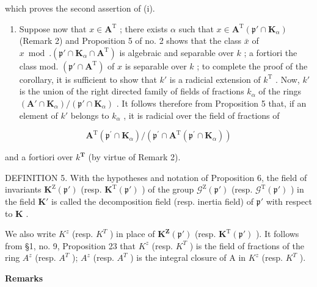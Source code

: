 which proves the second assertion of (i).

\begin{enumerate}
\def\labelenumi{(\roman{enumi})}
\setcounter{enumi}{1}
\tightlist
\item
  Suppose now that \(x \in \mathbf{A}^{\mathrm{T}}\) ; there exists \(\alpha\) such that \(x \in \mathbf{A}^{\mathrm{T}}(\mathfrak{p}' \cap \mathbf{K}_{\alpha})\) (Remark 2) and Proposition 5 of no. 2 shows that the class \(\bar{x}\) of \(x \bmod. (\mathfrak{p}' \cap \mathbf{K}_{\alpha} \cap \mathbf{A}^{\mathrm{T}})\) is algebraic and separable over \(k\) ; a fortiori the class mod. \((\mathfrak{p}' \cap \mathbf{A}^{\mathrm{T}})\) of \(x\) is separable over \(k\) ; to complete the proof of the corollary, it is sufficient to show that \(k'\) is a radicial extension of \(k^{\mathrm{T}}\) . Now, \(k'\) is the union of the right directed family of fields of fractions \(k_{\alpha}\) of the rings \((\mathbf{A}' \cap \mathbf{K}_{\alpha}) / (\mathfrak{p}' \cap \mathbf{K}_{\alpha})\) . It follows therefore from Proposition 5 that, if an element of \(k'\) belongs to \(k_{\alpha}\) , it is radicial over the field of fractions of
\end{enumerate}

\[
\mathbf {A} ^ {\mathrm{T}} \left(\mathfrak {p} ^ {\prime} \cap \mathbf {K} _ {\alpha}\right) / \left(\mathfrak {p} ^ {\prime} \cap \mathbf {A} ^ {\mathrm{T}} \left(\mathfrak {p} ^ {\prime} \cap \mathbf {K} _ {\alpha}\right)\right)
\]

and a fortiori over \(k^{\mathbf{T}}\) (by virtue of Remark 2).

DEFINITION 5. With the hypotheses and notation of Proposition 6, the field of invariants \(\mathbf{K}^{\mathrm{Z}}(\mathfrak{p}')\) (resp. \(\mathbf{K}^{\mathrm{T}}(\mathfrak{p}')\) ) of the group \(\mathcal{G}^{\mathrm{Z}}(\mathfrak{p}')\) (resp. \(\mathcal{G}^{\mathrm{T}}(\mathfrak{p}')\) ) in the field \(\mathbf{K}'\) is called the decomposition field (resp. inertia field) of \(\mathfrak{p}'\) with respect to \(\mathbf{K}\) .

We also write \(K^{z}\) (resp. \(K^{T}\) ) in place of \(\mathbf{K}^{\mathbf{Z}}(\mathfrak{p}')\) (resp. \(\mathbf{K}^{\mathrm{T}}(\mathfrak{p}')\) ). It follows from §1, no. 9, Proposition 23 that \(K^{z}\) (resp. \(K^{T}\) ) is the field of fractions of the ring \(A^{z}\) (resp. \(A^{T}\) ); \(A^{z}\) (resp. \(A^{T}\) ) is the integral closure of A in \(K^{z}\) (resp. \(K^{T}\) ).

\textbf{Remarks}\par

